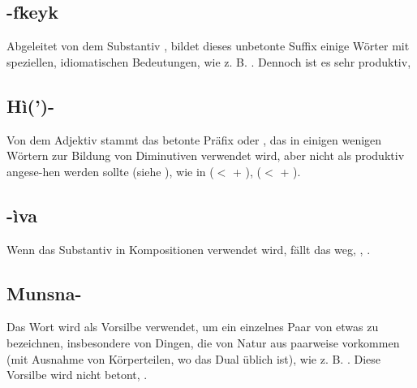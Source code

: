 \subsection{-fkeyk} Abgeleitet von dem Substantiv  , bildet dieses unbetonte Suffix einige Wörter mit speziellen, idiomatischen Bedeutungen, wie z. B.  . Dennoch ist es sehr produktiv,  

\subsection{Hì(')-} Von dem Adjektiv   stammt das betonte Präfix  oder , das in einigen wenigen Wörtern zur Bildung von Diminutiven verwendet wird, aber nicht als produktiv angese-hen werden sollte (siehe ), wie in   ($<$  +  ),   ($<$  +  ).

\subsection{-ìva} Wenn das Substantiv   in Kompositionen verwendet wird, fällt das  weg,  ,  .

\subsection{Munsna-} Das Wort   wird als Vorsilbe verwendet, um ein einzelnes Paar von etwas zu bezeichnen, insbesondere von Dingen, die von Natur aus paarweise vorkommen (mit Ausnahme von Körperteilen, wo das Dual üblich ist), wie z. B.  . Diese Vorsilbe wird nicht betont,  .

